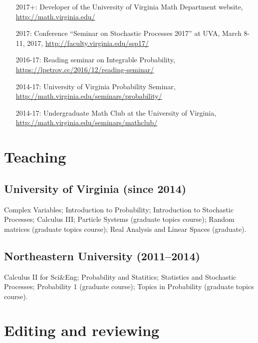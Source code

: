 \documentclass[letterpaper,11pt]{article}
\begin{document}
\begin{itemize}
	\item [2017+:]
		Developer of the University of Virginia Math Department website,
		\url{http://math.virginia.edu/}
	\item
	      [2017:] Conference
	      ``Seminar on Stochastic Processes 2017'' at UVA,
				March 8-11, 2017,
	      \url{http://faculty.virginia.edu/ssp17/}
	\item
	      [2016-17:]
				Reading seminar on Integrable Probability,
	      \url{https://lpetrov.cc/2016/12/reading-seminar/}
	\item
			[2014-17:] University of Virginia Probability Seminar,
	      \url{http://math.virginia.edu/seminars/probability/}
	\item
	      [2014-17:]
				Undergraduate Math Club at the University of Virginia,
	      \url{http://math.virginia.edu/seminars/mathclub/}
\end{itemize}

\section*{Teaching}

\subsection*{University of Virginia (since 2014)}

Complex Variables;
Introduction to
Probability; 
Introduction to
Stochastic Processes;
Calculus III;
Particle Systems (graduate topics course);
Random matrices (graduate topics course);
Real Analysis and Linear Spaces (graduate).

\subsection*{Northeastern University (2011--2014)}

Calculus II for
Sci\&Eng;
Probability and
Statitics;
Statistics and
Stochastic Processes;
Probability 1
(graduate course);
Topics in Probability (graduate topics course).

\section*{Editing and reviewing}
\end{document}
